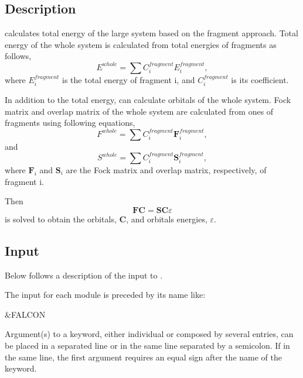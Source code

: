 \section{}
\label{UG:sec:falcon}

\subsection{Description}
\label{UG:sec:falcon_description}
 calculates total energy of the large system based on
the fragment approach.
Total energy of the whole system is calculated from total energies of
fragments as follows,
\[
   E^{whole}=\sum C_i^{fragment} E_i^{fragment},
\]
where $E_i^{fragment}$ is the total energy of fragment i, and
$C_i^{fragment}$ is its coefficient.

In addition to the total energy,  can calculate orbitals
of the whole system.
Fock matrix and overlap matrix of the whole system are calculated from
ones of fragments using following equations,
\[
   F^{whole}=\sum C_i^{fragment} \textbf{F}_i^{fragment},
\]
and
\[
   S^{whole}=\sum C_i^{fragment} \textbf{S}_i^{fragment},
\]
where
$\textbf{F}_i$ and $\textbf{S}_i$ are the Fock matrix and overlap matrix,
respectively, of fragment i.

Then
\[
   \textbf{FC}=\textbf{SC$\varepsilon$}
\]
is solved to obtain the orbitals, \textbf{C}, and orbitals energies,
\textbf{$\varepsilon$}.


\subsection{Input}
\label{UG:falcon:falcon_inpfalcon}

Below follows a description of the input to .

The input for each module is preceded by its name like:
\begin{inputlisting}
 &FALCON
\end{inputlisting}

Argument(s) to a keyword, either individual or composed by several entries,
can be placed in a separated line or in the same line separated by a semicolon.
If in the same line, the first argument requires an equal sign after the
name of the keyword.

